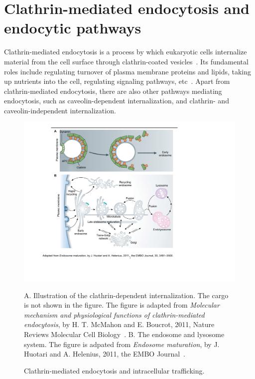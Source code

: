 \section{Clathrin-mediated endocytosis and endocytic pathways}
Clathrin-mediated endocytosis is a process by which eukaryotic cells internalize material from the cell surface through clathrin-coated vesicles~\cite{McMahon}. Its fundamental roles include regulating turnover of plasma membrane proteins and lipids, taking up nutrients into the cell, regulating signaling pathways, etc~\cite{McMahon,Humphries}. Apart from clathrin-mediated endocytosis, there are also other pathways mediating endocytosis, such as caveolin-dependent internalization, and clathrin- and caveolin-independent internalization.
\begin{figure}[h]
\centering
\includegraphics[scale=0.7]{Figures/endocytosis}
\caption{Clathrin-mediated endocytosis and intracellular trafficking.}
\vspace*{-3mm}
\small \justify
A. Illustration of the clathrin-dependent internalization. The cargo is not shown in the figure. The figure is adapted from \textit{Molecular mechanism and physiological functions of clathrin-mediated endocytosis}, by H. T. McMahon and E. Boucrot, 2011, Nature Reviews Molecular Cell Biology~\cite{McMahon}. B. The endosome and lysosome system. The figure is adpated from \textit{Endosome maturation}, by J. Huotari and A. Helenius, 2011, the EMBO Journal~\cite{Huotari}. 
\label{fig:endocytosis}
\end{figure}

